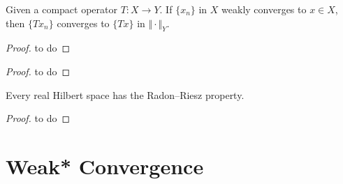 \begin{theorem}
Given a compact operator $T \colon X \to Y$. If $\{x_n\}$ in $X$ weakly converges to $x \in X$, then $\{T x_n\}$ converges to $\{T x\}$ in $\Vert \cdot \Vert_{Y}$. 
\end{theorem}

\begin{proof}
to do
\end{proof}

\begin{definition}
\end{definition}

\begin{definition}
\end{definition}

\begin{theorem}
\end{theorem}

\begin{proof}
to do
\end{proof}

\begin{corollary}
Every real Hilbert space has the Radon–Riesz property. 
\end{corollary}

\begin{proof}
to do
\end{proof}

\section{Weak* Convergence}





